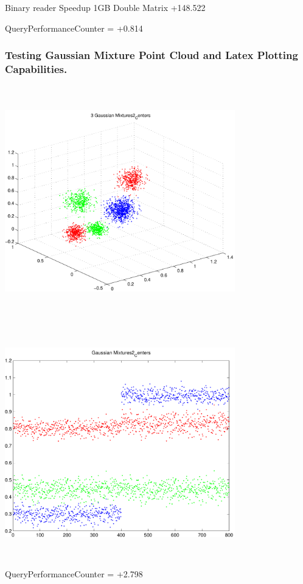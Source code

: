 \documentclass[9pt]{article}
\theoremstyle{plain}
\theoremstyle{definition}
\theoremstyle{remark}
\numberwithin{equation}{section}
\begin{document}
Binary reader Speedup 1GB Double Matrix +148.522

QueryPerformanceCounter  =  +0.814
\subsubsection{Testing Gaussian Mixture Point Cloud and Latex Plotting Capabilities.}
\includegraphics[width=10.0cm,height=10.0cm]{GaussianMixture_Dim_3_Centers2.pdf}

\includegraphics[width=10.0cm,height=10.0cm]{GaussianMixture_Dim_1_Centers2.pdf}

QueryPerformanceCounter  =  +2.798
\end{document}
